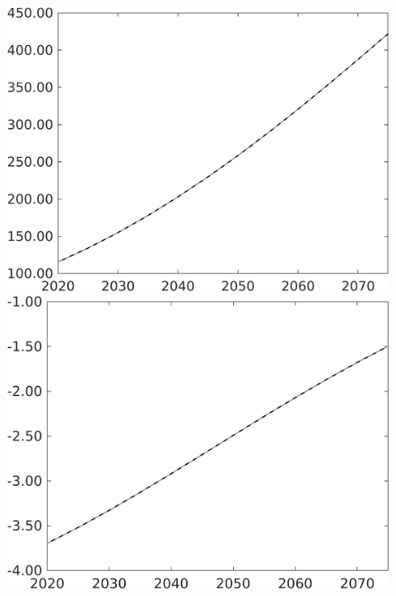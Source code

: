 \documentclass[12pt]{article}
\begin{document}
\begin{figure}[h!!]
\begin{minipage}[]{0.32\textwidth}
\end{minipage}		
\begin{minipage}[]{0.32\textwidth}
\includegraphics[width=1\textwidth]{../../codding_model/own_basedOnFried/optimalPol_010922_revision/figures/all_13Sept22/PerdifNoTauf_Equlab_regime0_CompTaul_pee_spillover0_nsk1_xgr1_knspil1_sep1_LFlimit0_emsbase0_countec0_GovRev0_etaa0.79_lgd0.png}
\end{minipage}	
\begin{minipage}[]{0.32\textwidth}
\includegraphics[width=1\textwidth]{../../codding_model/own_basedOnFried/optimalPol_010922_revision/figures/all_13Sept22/PerdifNoTauf_Equlab_regime0_CompTaul_pf_spillover0_nsk1_xgr1_knspil1_sep1_LFlimit0_emsbase0_countec0_GovRev0_etaa0.79_lgd0.png}

\end{minipage}
\end{figure}
\end{document}
